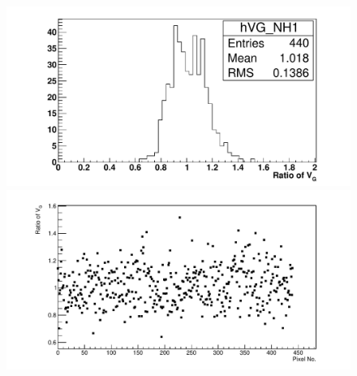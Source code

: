\begin{figure} %
\includegraphics[width=\textwidth]{chapters/graphs/GainVarsMeas/LL_m04_2016-06-11/Set0and2/GainVairanceHist_Average_Method2.pdf}
\caption{}
\vspace{3mm}
\includegraphics[width=\textwidth]{chapters/graphs/GainVarsMeas/LL_m04_2016-06-11/Set0and2/GainVars_Vs_Pixel_GainVariance_Average_Method2_Set0and2.pdf}
\caption{}
\end{figure}